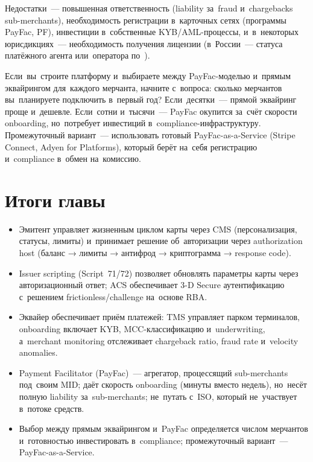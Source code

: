 Недостатки~--- повышенная ответственность (liability за~fraud
и~chargebacks sub-merchants), необходимость регистрации
в~карточных сетях (программы  PayFac, 
PF), инвестиции в~собственные KYB/AML-процессы, и~в~некоторых
юрисдикциях~--- необходимость получения лицензии (в~России~---
статуса платёжного агента или~оператора
по~).

\begin{practice}
  Если~вы~строите платформу и~выбираете между PayFac-моделью
  и~прямым эквайрингом для~каждого мерчанта, начните
  с~вопроса: сколько мерчантов вы~планируете подключить
  в~первый год? Если~десятки~--- прямой эквайринг проще
  и~дешевле. Если~сотни и~тысячи~--- PayFac окупится
  за~счёт скорости onboarding, но~потребует инвестиций
  в~compliance-инфраструктуру. Промежуточный вариант~---
  использовать готовый PayFac-as-a-Service (Stripe Connect,
  Adyen for Platforms), который берёт на~себя регистрацию
  и~compliance в~обмен на~комиссию.
\end{practice}


\section*{Итоги главы}

\begin{itemize}
  \item Эмитент управляет жизненным циклом карты через CMS
        (персонализация, статусы, лимиты) и~принимает решение
        об~авторизации через authorization host (баланс → лимиты
        → антифрод → криптограмма → response code).
  \item Issuer scripting (Script~71/72) позволяет обновлять
        параметры карты через авторизационный ответ; ACS
        обеспечивает 3-D Secure аутентификацию с~решением
        frictionless/challenge на~основе RBA.
  \item Эквайер обеспечивает приём платежей: TMS управляет
        парком терминалов, onboarding включает KYB,
        MCC-классификацию и~underwriting, а~merchant monitoring
        отслеживает chargeback ratio, fraud rate и~velocity
        anomalies.
  \item Payment Facilitator (PayFac)~--- агрегатор, процессящий
        sub-merchants под~своим MID; даёт скорость onboarding
        (минуты вместо недель), но~несёт полную liability
        за~sub-merchants; не~путать с~ISO, который не~участвует
        в~потоке средств.
  \item Выбор между прямым эквайрингом и~PayFac определяется
        числом мерчантов и~готовностью инвестировать
        в~compliance; промежуточный вариант~--- PayFac-as-a-Service.
\end{itemize}
